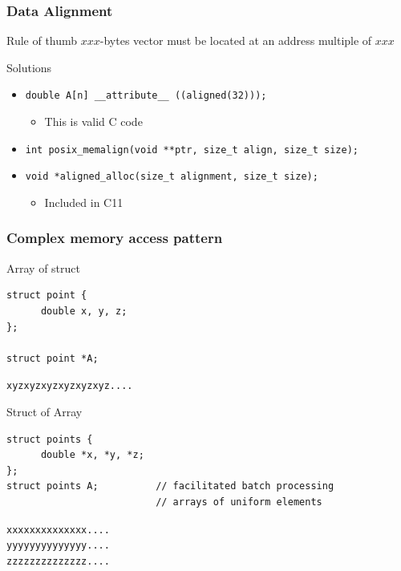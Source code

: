 \documentclass[xcolor={x11names,svgnames}]{beamer}
\begin{document}
\begin{frame}[fragile=singleslide]
  \frametitle{Data Alignment}

  \begin{alertblock}{Rule of thumb}
    $xxx$-bytes vector must be located at an address multiple of $xxx$  
  \end{alertblock}

  \bigskip
  
  \begin{exampleblock}{Solutions}
    \begin{itemize}
    \item \texttt{double A[n] __attribute__ ((aligned(32)));}
      \begin{itemize}
      \item This is valid C code
      \end{itemize}
  \item \texttt{int posix_memalign(void **ptr, size_t align, size_t size);}
  \item \texttt{void *aligned_alloc(size_t alignment, size_t size);}
      \begin{itemize}
      \item Included in C11
      \end{itemize}
  \end{itemize}
\end{exampleblock}
\end{frame}


\begin{frame}[fragile=singleslide]
  \frametitle{Complex memory access pattern}

\begin{alertblock}{Array of struct}
  \begin{verbatim}
struct point {
      double x, y, z;
};

struct point *A;
  \end{verbatim}

\texttt{xyzxyzxyzxyzxyzxyz....}
\end{alertblock}

\begin{exampleblock}{Struct of Array}
  \begin{verbatim}
struct points {
      double *x, *y, *z;
};
struct points A;          // facilitated batch processing
                          // arrays of uniform elements
  \end{verbatim}

  \texttt{xxxxxxxxxxxxxx....}\\
    \texttt{yyyyyyyyyyyyyy....}\\
    \texttt{zzzzzzzzzzzzzz....}\\
\end{exampleblock}

\end{frame}
\end{document}
